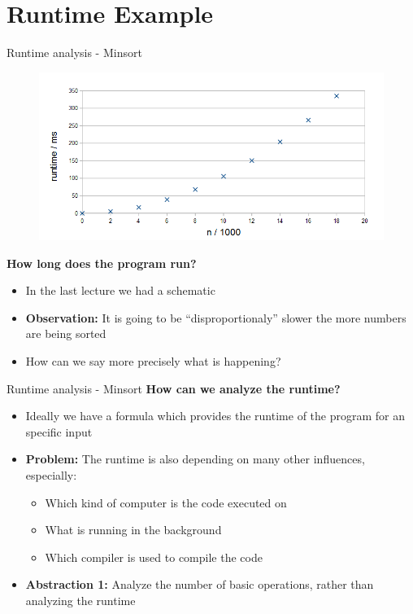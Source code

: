 \section{Runtime Example}



\begin{frame}{Runtime analysis - Minsort}
  \vspace{-1em}
  \begin{figure}[!h]
    \includegraphics[width=0.75\linewidth]{Images/MinSort/Minsort.png}
    \label{fig:introduction:minsort_runtime}
  \end{figure}
  \vspace{-0.5em}
  \textbf{How long does the program run?}
  \begin{itemize}
    \item
      In the last lecture we had a schematic
    \item
      \textbf{Observation:} It is going to be \enquote{disproportionaly} slower
      the more numbers are being sorted
    \item
      How can we say more precisely what is happening?
  \end{itemize}
\end{frame}


\begin{frame}{Runtime analysis - Minsort}
  \textbf{How can we analyze the runtime?}
  \begin{itemize}
    \item
      Ideally we have a formula which provides the runtime of the program for
      an specific input
    \item<2- |handout:1>
      \textbf{Problem:}
      The runtime is also depending on many other influences, especially:
      \begin{itemize}
        \item
          Which kind of computer is the code executed on
        \item What is running in the background
        \item Which compiler is used to compile the code
      \end{itemize}
    \item<3- |handout:1>
      \textbf{Abstraction 1:}
      Analyze the number of basic operations, rather than analyzing the runtime
  \end{itemize}
\end{frame}